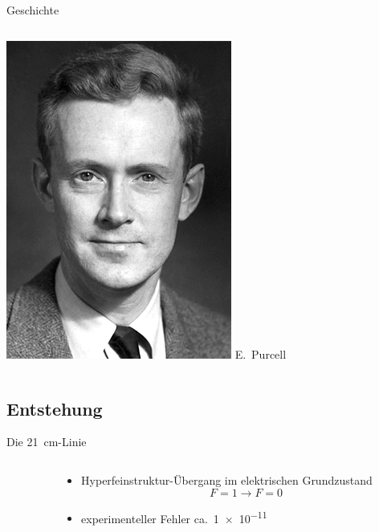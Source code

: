 \begin{frame}{Geschichte}
\begin{columns}[c, onlytextwidth]
      \includegraphics[width=\linewidth]{./images/Edward_Mills_Purcell.jpg}%
      \newline E.~Purcell
  \end{columns}%
\end{frame}
\subsection{Entstehung}
\begin{frame}{Die \SI{21}{\centi\meter}-Linie}
  \begin{columns}[c, onlytextwidth]%
    \begin{column}{0.6\textwidth}%
      
    \end{column}%
    \begin{column}{0.4\textwidth}%
      \begin{itemize}
        \item Hyperfeinstruktur-Übergang im elektrischen Grundzustand
          \begin{equation*}
            F = 1 → F = 0
          \end{equation*}
        \item experimenteller Fehler ca.\ \num{1e-11}
      \end{itemize}
    \end{column}%
  \end{columns}%
\end{frame}

